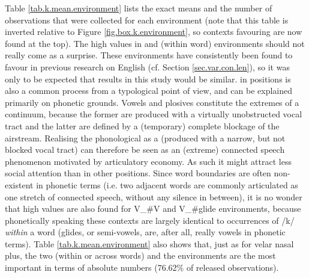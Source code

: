 Table \ref{tab.k.mean.environment} lists the exact means and the number of observations that were collected for each environment (note that this table is inverted relative to Figure \ref{fig.box.k.environment}, so contexts favouring  are now found at the top).
The high  values in  and  (within word) environments should not really come as a surprise.
These environments have consistently been found to favour  in previous research on  English (cf. Section \ref{sec.var.con.len}), so it was only to be expected that results in this study would be similar.
 in  positions is also a common process from a typological point of view, and can be explained primarily on phonetic grounds. 
Vowels and plosives constitute the extremes of a continuum, because the former are produced with a virtually unobstructed vocal tract and the latter are defined by a (temporary) complete blockage of the airstream.
Realising the phonological   as a  (produced with a narrow, but not blocked vocal tract) can therefore be seen as an (extreme) connected speech phenomenon motivated by articulatory economy.
As such it might attract less social attention than in other positions.
Since word boundaries are often non-existent in phonetic terms (i.e. two adjacent words are commonly articulated as one stretch of connected speech, without any silence in between), it is no wonder that high  values are also found for V\_\#V and V\_\#glide environments, because phonetically speaking these contexts are largely identical to  occurrences of /k/ \emph{within} a word (glides, or semi-vowels, are, after all, really vowels in phonetic terms).
Table \ref{tab.k.mean.environment} also shows that, just as for velar nasal plus, the two  (within or across words) and the  environments are the most important in terms of absolute numbers (76.62\% of released observations).

